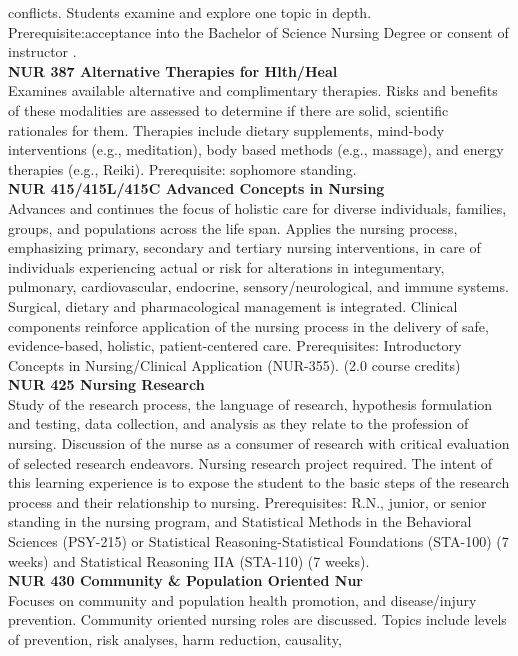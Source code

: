 \documentclass[
  letterpaper,
]{scrbook}
\begin{document}
conflicts. Students examine and explore one topic in depth.
Prerequisite:acceptance into the Bachelor of Science Nursing Degree or
consent of instructor .\\
\textbf{NUR 387 Alternative Therapies for Hlth/Heal}\\
Examines available alternative and complimentary therapies. Risks and
benefits of these modalities are assessed to determine if there are
solid, scientific rationales for them. Therapies include dietary
supplements, mind-body interventions (e.g., meditation), body based
methods (e.g., massage), and energy therapies (e.g., Reiki).
Prerequisite: sophomore standing.\\
\textbf{NUR 415/415L/415C Advanced Concepts in Nursing}\\
Advances and continues the focus of holistic care for diverse
individuals, families, groups, and populations across the life span.
Applies the nursing process, emphasizing primary, secondary and tertiary
nursing interventions, in care of individuals experiencing actual or
risk for alterations in integumentary, pulmonary, cardiovascular,
endocrine, sensory/neurological, and immune systems. Surgical, dietary
and pharmacological management is integrated. Clinical components
reinforce application of the nursing process in the delivery of safe,
evidence-based, holistic, patient-centered care. Prerequisites:
Introductory Concepts in Nursing/Clinical Application (NUR-355). (2.0
course credits)\\
\textbf{NUR 425 Nursing Research}\\
Study of the research process, the language of research, hypothesis
formulation and testing, data collection, and analysis as they relate to
the profession of nursing. Discussion of the nurse as a consumer of
research with critical evaluation of selected research endeavors.
Nursing research project required. The intent of this learning
experience is to expose the student to the basic steps of the research
process and their relationship to nursing. Prerequisites: R.N., junior,
or senior standing in the nursing program, and Statistical Methods in
the Behavioral Sciences (PSY-215) or Statistical Reasoning-Statistical
Foundations (STA-100) (7 weeks) and Statistical Reasoning IIA (STA-110)
(7 weeks).\\
\textbf{NUR 430 Community \& Population Oriented Nur}\\
Focuses on community and population health promotion, and disease/injury
prevention. Community oriented nursing roles are discussed. Topics
include levels of prevention, risk analyses, harm reduction, causality,
\end{document}
